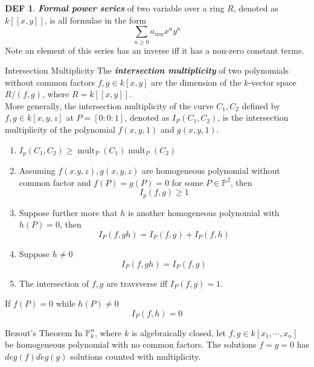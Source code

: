 \documentclass[twocolumn]{article}
\renewcommand{\emph}[1]{\textbf{\textit{#1}}}
\DeclareMathOperator{\mult}{mult}
\renewcommand{\P}{\mathbb{P}}
\theoremstyle{definition}
\newtheorem{defi}[thm]{DEF}
\theoremstyle{remark}
\begin{document}
\begin{defi}
	\emph{Formal power series} of two variable over a ring $R$, denoted as $k[[x, y]]$, is all formulae in the form 
	$$
	\sum_{n\geq 0} a_{nm}x^n y^n
	$$
	Note an element of this series has an inverse iff it has a non-zero constant terms.
\end{defi}

\begin{fthm}{Intersection Multiplicity}{}
	The \emph{intersection multiplicity} of two polynomials without common factors $f,g \in k[x, y]$ are the dimension of the $k$-vector space $R / (f, g)$, where $R = k[[x, y]]$.\\

	More generally, the intersection multiplicity of the curve $C_1, C_2$ defined by $f, g \in k[x, y, z]$ at $P = [0:0:1]$, denoted as $I_P(C_1, C_2)$, is the intersection multiplicity of the polynomial $f(x, y, 1)$ and $g(x, y, 1)$.
	\tcblower
	\begin{enumerate}
		\item $I_p(C_1, C_2) \geq \mult_P(C_1)\mult_P(C_2)$
		\item Assuming $f(x. y, z), g(x, y, z)$ are homogeneous polynomial without common factor and $f(P) = g(P) = 0$ for some $P \in \P^2$, then $$I_p(f,g) \geq 1$$
		\item Suppose further more that $h$ is another homogeneous polynomial with $h(P) = 0$, then 
			$$
			I_P(f, gh) = I_P(f, g) + I_P(f, h)
			$$
		\item Suppose $h \neq 0$
			$$
			I_P(f, gh) = I_P(f, g) 
			$$
		\item The intersection of $f, g$ are travsverse iff $I_P(f, g) = 1$.
	\end{enumerate}
\end{fthm}

\begin{toverify}{}{}
	 If $f(P) = 0$ while $h(P) \neq 0$
			$$
				I_P(f, h) = 0
			$$
\end{toverify}

\begin{toverify}{Bezout's Theorem}
	In $\P^n_k$, where $k$ is algebraically closed, let $f, g \in k[x_1, \cdots, x_n]$ be homogeneous polynomial with no common factors.
	The solutions $f=g=0$ has $deg(f)deg(g)$ solutions counted with multiplicity.
\end{toverify}
\end{document}
